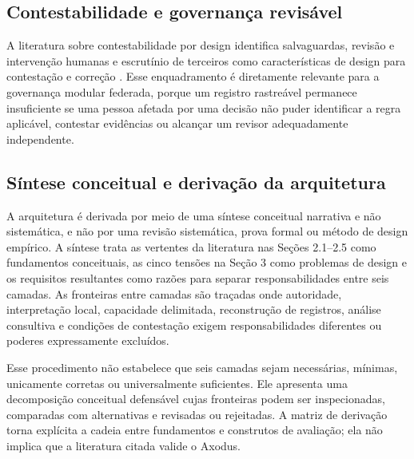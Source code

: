 \documentclass[11pt]{article}
\begin{document}
\subsection{Contestabilidade e governança revisável}

A literatura sobre contestabilidade por design identifica salvaguardas,
revisão e intervenção humanas e escrutínio de terceiros como características
de design para contestação e correção \citep{alfrink2023contestable}. Esse
enquadramento é diretamente relevante para a governança modular federada,
porque um registro rastreável permanece insuficiente se uma pessoa afetada por
uma decisão não puder identificar a regra aplicável, contestar evidências ou
alcançar um revisor adequadamente independente.

\subsection{Síntese conceitual e derivação da arquitetura}

A arquitetura é derivada por meio de uma síntese conceitual narrativa e não
sistemática, e não por uma revisão sistemática, prova formal ou método de
design empírico. A síntese trata as vertentes da literatura nas Seções
2.1--2.5 como fundamentos conceituais, as cinco tensões na Seção 3 como
problemas de design e os requisitos resultantes como razões para separar
responsabilidades entre seis camadas. As fronteiras entre camadas são traçadas
onde autoridade, interpretação local, capacidade delimitada, reconstrução de
registros, análise consultiva e condições de contestação exigem
responsabilidades diferentes ou poderes expressamente excluídos.

Esse procedimento não estabelece que seis camadas sejam necessárias, mínimas,
unicamente corretas ou universalmente suficientes. Ele apresenta uma
decomposição conceitual defensável cujas fronteiras podem ser inspecionadas,
comparadas com alternativas e revisadas ou rejeitadas. A matriz de derivação
torna explícita a cadeia entre fundamentos e construtos de avaliação; ela não
implica que a literatura citada valide o Axodus.
\end{document}
